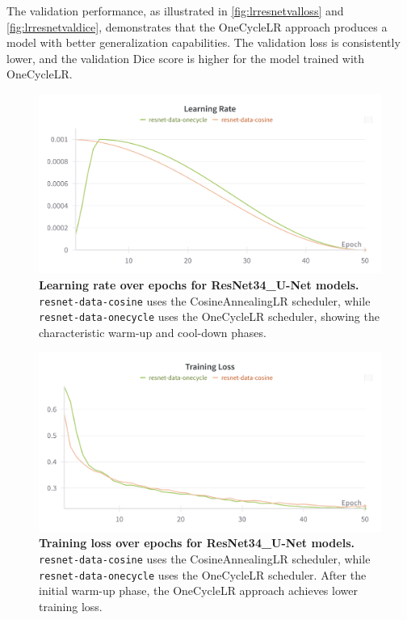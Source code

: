 \documentclass[twocolumn,a4paper]{article}
\begin{document}
The validation performance, as illustrated in \autoref{fig:lrresnetvalloss} and \autoref{fig:lrresnetvaldice}, demonstrates that the OneCycleLR approach produces a model with better generalization capabilities. The validation loss is consistently lower, and the validation Dice score is higher for the model trained with OneCycleLR.

\begin{figure}[H]
\centering
\includegraphics[width=0.95\linewidth]{figs/lr_resnet_lr}
\caption{\textbf{Learning rate over epochs for ResNet34\_U-Net models.} \texttt{resnet-data-cosine} uses the CosineAnnealingLR scheduler, while \texttt{resnet-data-onecycle} uses the OneCycleLR scheduler, showing the characteristic warm-up and cool-down phases.}
\label{fig:lrresnetlr}
\end{figure}
\begin{figure}[H]
\centering
\includegraphics[width=0.95\linewidth]{figs/lr_resnset_train_loss}
\caption{\textbf{Training loss over epochs for ResNet34\_U-Net models.} \texttt{resnet-data-cosine} uses the CosineAnnealingLR scheduler, while \texttt{resnet-data-onecycle} uses the OneCycleLR scheduler. After the initial warm-up phase, the OneCycleLR approach achieves lower training loss.}
\label{fig:lrresnsettrainloss}
\end{figure}
\end{document}
